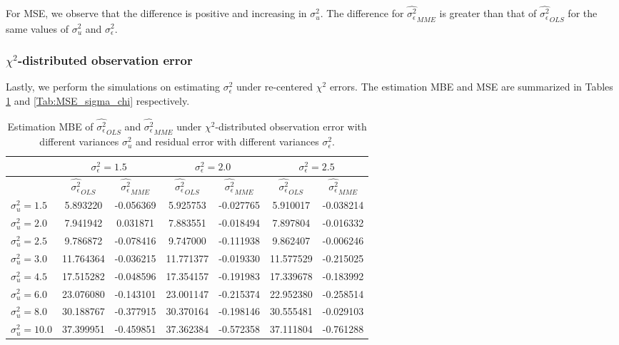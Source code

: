 \documentclass{article}
\begin{document}
For MSE, we observe that the difference is positive and increasing in $\sigma^2_u$.
The difference for $\hat{\sigma^2_\epsilon}_{MME}$ is greater than that of $\hat{\sigma^2_\epsilon}_{OLS}$ for the same values of $\sigma^2_u$ and $\sigma^2_\epsilon$.

\subsubsection{$\chi^2$-distributed observation error}

Lastly, we perform the simulations on estimating $\sigma^2_\epsilon$ under re-centered $\chi^2$ errors.
The estimation MBE and MSE are summarized in Tables \ref{Tab:MBE_sigma_chi} and \ref{Tab:MSE_sigma_chi} respectively.

\begin{table}[ht]
    \centering
    \caption{Estimation MBE of $\hat{\sigma^2_\epsilon}_{OLS}$ and $\hat{\sigma^2_\epsilon}_{MME}$ under $\chi^2$-distributed observation error with different variances $\sigma^2_u$ and residual error with different variances $\sigma^2_\epsilon$.}
    \label{Tab:MBE_sigma_chi}
    \begin{tabular}[t]{lcccccc}
        \hline
        &\multicolumn{2}{c}{$\sigma^2_\epsilon=1.5$}&\multicolumn{2}{c}{$\sigma^2_\epsilon=2.0$}&\multicolumn{2}{c}{$\sigma^2_\epsilon=2.5$}\\
        \hline
        &$\hat{\sigma^2_\epsilon}_{OLS}$&$\hat{\sigma^2_\epsilon}_{MME}$&$\hat{\sigma^2_\epsilon}_{OLS}$&
        $\hat{\sigma^2_\epsilon}_{MME}$&$\hat{\sigma^2_\epsilon}_{OLS}$&$\hat{\sigma^2_\epsilon}_{MME}$\\
        \hline
        $\sigma^2_u = 1.5$&5.893220&-0.056369&5.925753&-0.027765&5.910017&-0.038214\\
        $\sigma^2_u = 2.0$&7.941942&0.031871&7.883551&-0.018494&7.897804&-0.016332\\
        $\sigma^2_u = 2.5$&9.786872&-0.078416&9.747000&-0.111938&9.862407&-0.006246\\
        $\sigma^2_u = 3.0$&11.764364&-0.036215&11.771377&-0.019330&11.577529&-0.215025\\
        $\sigma^2_u = 4.5$&17.515282&-0.048596&17.354157&-0.191983&17.339678&-0.183992\\
        $\sigma^2_u = 6.0$&23.076080&-0.143101&23.001147&-0.215374&22.952380&-0.258514\\
        $\sigma^2_u = 8.0$&30.188767&-0.377915&30.370164&-0.198146&30.555481&-0.029103\\
        $\sigma^2_u = 10.0$&37.399951&-0.459851&37.362384&-0.572358&37.111804&-0.761288\\
        \hline
    \end{tabular}
\end{table}
\end{document}
